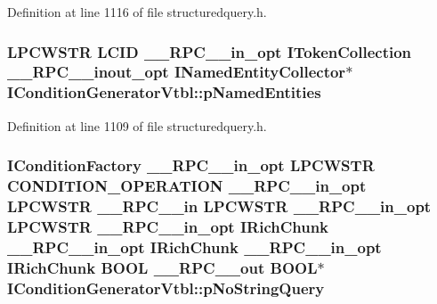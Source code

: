 Definition at line 1116 of file structuredquery.\+h.

\subsubsection[{\texorpdfstring{p\+Named\+Entities}{pNamedEntities}}]{ {\bf L\+P\+C\+W\+S\+TR} {\bf L\+C\+ID} {\bf \+\_\+\+\_\+\+R\+P\+C\+\_\+\+\_\+in\+\_\+opt} {\bf I\+Token\+Collection} {\bf \+\_\+\+\_\+\+R\+P\+C\+\_\+\+\_\+inout\+\_\+opt} {\bf I\+Named\+Entity\+Collector}$\ast$ I\+Condition\+Generator\+Vtbl\+::p\+Named\+Entities}\hypertarget{struct_i_condition_generator_vtbl_a43ea0bdd7e281524e9f68555625184e7}{}\label{struct_i_condition_generator_vtbl_a43ea0bdd7e281524e9f68555625184e7}


Definition at line 1109 of file structuredquery.\+h.

\subsubsection[{\texorpdfstring{p\+No\+String\+Query}{pNoStringQuery}}]{ {\bf I\+Condition\+Factory} {\bf \+\_\+\+\_\+\+R\+P\+C\+\_\+\+\_\+in\+\_\+opt} {\bf L\+P\+C\+W\+S\+TR} {\bf C\+O\+N\+D\+I\+T\+I\+O\+N\+\_\+\+O\+P\+E\+R\+A\+T\+I\+ON} {\bf \+\_\+\+\_\+\+R\+P\+C\+\_\+\+\_\+in\+\_\+opt} {\bf L\+P\+C\+W\+S\+TR} {\bf \+\_\+\+\_\+\+R\+P\+C\+\_\+\+\_\+in} {\bf L\+P\+C\+W\+S\+TR} {\bf \+\_\+\+\_\+\+R\+P\+C\+\_\+\+\_\+in\+\_\+opt} {\bf L\+P\+C\+W\+S\+TR} {\bf \+\_\+\+\_\+\+R\+P\+C\+\_\+\+\_\+in\+\_\+opt} {\bf I\+Rich\+Chunk} {\bf \+\_\+\+\_\+\+R\+P\+C\+\_\+\+\_\+in\+\_\+opt} {\bf I\+Rich\+Chunk} {\bf \+\_\+\+\_\+\+R\+P\+C\+\_\+\+\_\+in\+\_\+opt} {\bf I\+Rich\+Chunk} {\bf B\+O\+OL} {\bf \+\_\+\+\_\+\+R\+P\+C\+\_\+\+\_\+out} {\bf B\+O\+OL}$\ast$ I\+Condition\+Generator\+Vtbl\+::p\+No\+String\+Query}\hypertarget{struct_i_condition_generator_vtbl_a5ea98d67cb369a46d33d10e8294198b5}{}\label{struct_i_condition_generator_vtbl_a5ea98d67cb369a46d33d10e8294198b5}


